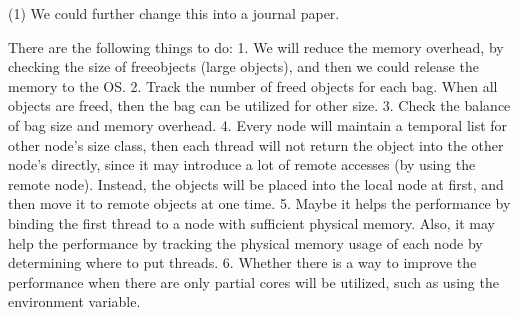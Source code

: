 (1) We could further change this into a journal paper. 

There are the following things to do:
1. We will reduce the memory overhead, by checking the size of freeobjects (large objects), and then we could 
release the memory to the OS.  
2. Track the number of freed objects for each bag. When all objects are freed, then the bag can be utilized for other size. 
3. Check the balance of bag size and memory overhead.
4. Every node will maintain a temporal list for other node's size class, then each thread will not return the object into the other node's directly, since it may introduce a lot of remote accesses (by using the remote node). Instead, the objects will be placed into the local node at first, and then move it to remote objects at one time.
5. Maybe it helps the performance by binding the first thread to a node with sufficient physical memory. Also, it may help the performance by tracking the physical memory usage of each node by determining where to put threads.
6. Whether there is a way to improve the performance when there are only partial cores will be utilized, such as using the environment variable.   
